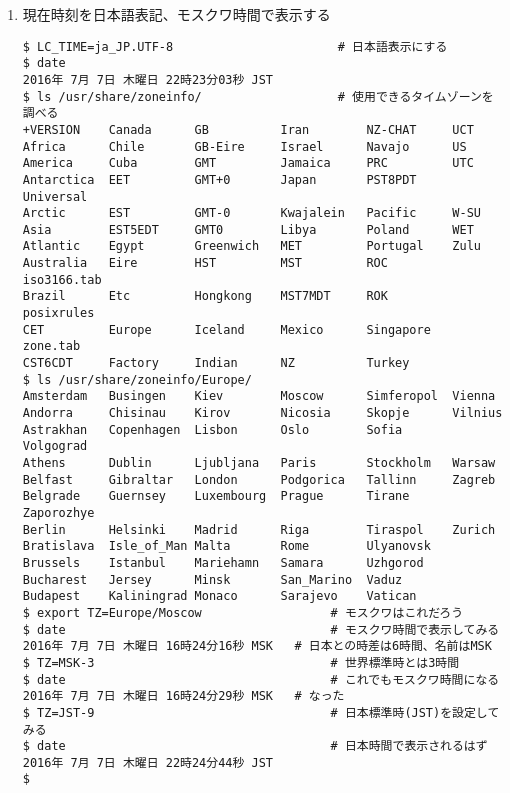 \documentclass[a4j,dvipdfmx]{jarticle}
\begin{document}
\def\lstlistingname{リスト}

\begin{enumerate}
\item 現在時刻を日本語表記、モスクワ時間で表示する

\begin{lstlisting}[caption=日本語表記、モスクワ時間で表示する手順]
$ LC_TIME=ja_JP.UTF-8                       # 日本語表示にする
$ date
2016年 7月 7日 木曜日 22時23分03秒 JST
$ ls /usr/share/zoneinfo/                   # 使用できるタイムゾーンを調べる
+VERSION    Canada      GB          Iran        NZ-CHAT     UCT
Africa      Chile       GB-Eire     Israel      Navajo      US
America     Cuba        GMT         Jamaica     PRC         UTC
Antarctica  EET         GMT+0       Japan       PST8PDT     Universal
Arctic      EST         GMT-0       Kwajalein   Pacific     W-SU
Asia        EST5EDT     GMT0        Libya       Poland      WET
Atlantic    Egypt       Greenwich   MET         Portugal    Zulu
Australia   Eire        HST         MST         ROC         iso3166.tab
Brazil      Etc         Hongkong    MST7MDT     ROK         posixrules
CET         Europe      Iceland     Mexico      Singapore   zone.tab
CST6CDT     Factory     Indian      NZ          Turkey
$ ls /usr/share/zoneinfo/Europe/
Amsterdam   Busingen    Kiev        Moscow      Simferopol  Vienna
Andorra     Chisinau    Kirov       Nicosia     Skopje      Vilnius
Astrakhan   Copenhagen  Lisbon      Oslo        Sofia       Volgograd
Athens      Dublin      Ljubljana   Paris       Stockholm   Warsaw
Belfast     Gibraltar   London      Podgorica   Tallinn     Zagreb
Belgrade    Guernsey    Luxembourg  Prague      Tirane      Zaporozhye
Berlin      Helsinki    Madrid      Riga        Tiraspol    Zurich
Bratislava  Isle_of_Man Malta       Rome        Ulyanovsk
Brussels    Istanbul    Mariehamn   Samara      Uzhgorod
Bucharest   Jersey      Minsk       San_Marino  Vaduz
Budapest    Kaliningrad Monaco      Sarajevo    Vatican
$ export TZ=Europe/Moscow                  # モスクワはこれだろう
$ date                                     # モスクワ時間で表示してみる
2016年 7月 7日 木曜日 16時24分16秒 MSK   # 日本との時差は6時間、名前はMSK
$ TZ=MSK-3                                 # 世界標準時とは3時間
$ date                                     # これでもモスクワ時間になる
2016年 7月 7日 木曜日 16時24分29秒 MSK   # なった
$ TZ=JST-9                                 # 日本標準時(JST)を設定してみる
$ date                                     # 日本時間で表示されるはず
2016年 7月 7日 木曜日 22時24分44秒 JST
$
\end{lstlisting}


\end{enumerate}
\end{document}
